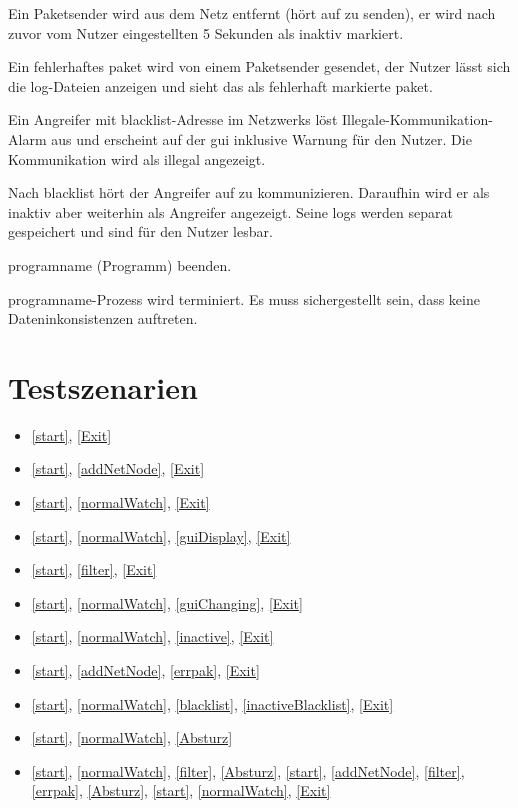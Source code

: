 \begin{description}[style=multiline, leftmargin=4cm, labelwidth=4cm]
  \item[\namedlabel{inactive}{Netzteilnehmer wird inaktiv}] Ein Paketsender wird aus dem Netz entfernt (hört auf zu senden), er wird nach zuvor vom Nutzer eingestellten 5 Sekunden als inaktiv markiert.
  \item[\namedlabel{errpak}{Fehlerhaftes Paket}] Ein fehlerhaftes \gls{paket} wird von einem Paketsender gesendet, der Nutzer lässt sich die \gls{log}-Dateien anzeigen und sieht das als fehlerhaft markierte \gls{paket}.
  \item[\namedlabel{blacklist}{Blacklist}] Ein Angreifer mit \gls{blacklist}-Adresse im Netzwerks löst Illegale-Kommunikation-Alarm aus und erscheint auf der \gls{gui} inklusive Warnung für den Nutzer. Die Kommunikation wird als illegal angezeigt.
  \item[\namedlabel{inactiveBlacklist}{Inaktiver geblacklisteter Teilnehmer}] Nach \gls{blacklist} hört der Angreifer auf zu kommunizieren. Daraufhin wird er als inaktiv aber weiterhin als Angreifer angezeigt. Seine \glspl{log} werden separat gespeichert und sind für den Nutzer lesbar.
  \item[\namedlabel{Exit}{Exit}] \gls{programname} (Programm) beenden.
  \item[\namedlabel{Absturz}{Absturz}] \gls{programname}-Prozess wird terminiert. Es muss sichergestellt sein, dass keine Dateninkonsistenzen auftreten.
\end{description}

\section{Testszenarien}

\begin{itemize}
  \item \ref{start}, \ref{Exit}
  \item \ref{start}, \ref{addNetNode}, \ref{Exit}
  \item \ref{start}, \ref{normalWatch}, \ref{Exit}
  \item \ref{start}, \ref{normalWatch}, \ref{guiDisplay}, \ref{Exit}
  \item \ref{start}, \ref{filter}, \ref{Exit}
  \item \ref{start}, \ref{normalWatch}, \ref{guiChanging}, \ref{Exit}
  \item \ref{start}, \ref{normalWatch}, \ref{inactive}, \ref{Exit}
  \item \ref{start}, \ref{addNetNode}, \ref{errpak}, \ref{Exit}
  \item \ref{start}, \ref{normalWatch}, \ref{blacklist}, \ref{inactiveBlacklist}, \ref{Exit}
  \item \ref{start}, \ref{normalWatch}, \ref{Absturz}
  \item \ref{start}, \ref{normalWatch}, \ref{filter}, \ref{Absturz}, \ref{start}, \ref{addNetNode}, \ref{filter}, \ref{errpak}, \ref{Absturz}, \ref{start}, \ref{normalWatch}, \ref{Exit}
\end{itemize}

